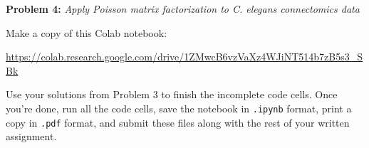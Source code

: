 \documentclass[11pt]{article}
\begin{document}
\clearpage

\textbf{Problem 4:} \textit{Apply Poisson matrix factorization to C. elegans connectomics data}

Make a copy of this Colab notebook: 

\begin{center}
    \url{https://colab.research.google.com/drive/1ZMwcB6vzVaXz4WJiNT514b7zB5s3_SBk}
\end{center}

Use your solutions from Problem 3 to finish the incomplete code cells. Once you're done, run all the code cells, save the notebook in \texttt{.ipynb} format, print a copy in \texttt{.pdf} format, and submit these files along with the rest of your written assignment.
\end{document}
